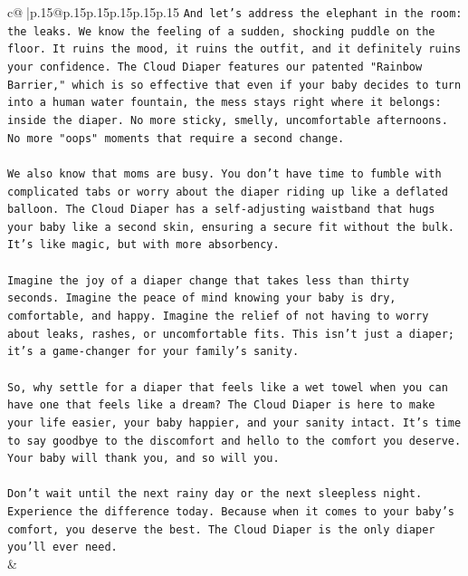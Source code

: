 \documentclass{article}
\begin{document}
{\begin{supertabular}{c@{$\;$}|p{.15\linewidth}@{}p{.15\linewidth}p{.15\linewidth}p{.15\linewidth}p{.15\linewidth}p{.15\linewidth}}
{{{\texttt{And let's address the elephant in the room: the leaks. We know the feeling of a sudden, shocking puddle on the floor. It ruins the mood, it ruins the outfit, and it definitely ruins your confidence. The Cloud Diaper features our patented "Rainbow Barrier," which is so effective that even if your baby decides to turn into a human water fountain, the mess stays right where it belongs: inside the diaper. No more sticky, smelly, uncomfortable afternoons. No more "oops" moments that require a second change.} \\
\\ 
\texttt{We also know that moms are busy. You don't have time to fumble with complicated tabs or worry about the diaper riding up like a deflated balloon. The Cloud Diaper has a self{-}adjusting waistband that hugs your baby like a second skin, ensuring a secure fit without the bulk. It's like magic, but with more absorbency.} \\
\\ 
\texttt{Imagine the joy of a diaper change that takes less than thirty seconds. Imagine the peace of mind knowing your baby is dry, comfortable, and happy. Imagine the relief of not having to worry about leaks, rashes, or uncomfortable fits. This isn't just a diaper; it's a game{-}changer for your family's sanity.} \\
\\ 
\texttt{So, why settle for a diaper that feels like a wet towel when you can have one that feels like a dream? The Cloud Diaper is here to make your life easier, your baby happier, and your sanity intact. It's time to say goodbye to the discomfort and hello to the comfort you deserve. Your baby will thank you, and so will you.} \\
\\ 
\texttt{Don't wait until the next rainy day or the next sleepless night. Experience the difference today. Because when it comes to your baby's comfort, you deserve the best. The Cloud Diaper is the only diaper you'll ever need.} \\
            }
        }
    }
    & \\ \\


\end{supertabular}}
\end{document}
